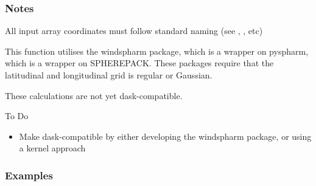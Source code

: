 \documentclass[letterpaper,10pt,english]{sphinxmanual}
\begin{document}
\begin{fulllineitems}
\begin{quote}
\begin{description}
\begin{description}
\end{description}

\end{description}\end{quote}
\subsubsection*{Notes}

\begin{DUlineblock}{0em}
\item[] All input array coordinates must follow standard naming (see ,                 , etc)
\item[] This function utilises the windspharm package, which is a wrapper on pyspharm, which is a                 wrapper on SPHEREPACK. These packages require that the latitudinal and longitudinal grid                 is regular or Gaussian.
\item[] These calculations are not yet dask-compatible.
\end{DUlineblock}

To Do
\begin{itemize}
\item {} 
Make dask-compatible by either developing the windspharm package, or using a kernel approach

\end{itemize}
\subsubsection*{Examples}


\end{fulllineitems}
\end{document}
